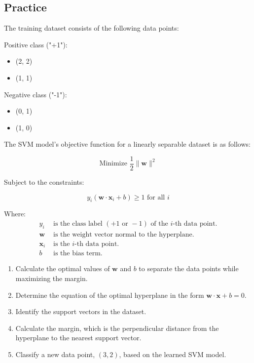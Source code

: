 \documentclass[]{article}
\begin{document}
	
	
	
	\subsection{Practice}
	The training dataset consists of the following data points:
	
	Positive class ("+1"):
	\begin{itemize}
		\item (2, 2)
		\item (1, 1)
	\end{itemize}
	
	Negative class ("-1"):
	\begin{itemize}
		\item (0, 1)
		\item (1, 0)
	\end{itemize}
	
	The SVM model's objective function for a linearly separable dataset is as follows:
	
	\[
	\text{Minimize } \frac{1}{2}\|\mathbf{w}\|^2
	\]
	
	Subject to the constraints:
	
	\[
	y_i(\mathbf{w}\cdot\mathbf{x}_i + b) \geq 1 \text{ for all } i
	\]
	
	Where:
	\begin{align*}
		y_i & \text{ is the class label } (+1 \text{ or } -1) \text{ of the } i\text{-th data point.} \\
		\mathbf{w} & \text{ is the weight vector normal to the hyperplane.} \\
		\mathbf{x}_i & \text{ is the } i\text{-th data point.} \\
		b & \text{ is the bias term.}
	\end{align*}
	
	\begin{enumerate}
		\item Calculate the optimal values of \(\mathbf{w}\) and \(b\) to separate the data points while maximizing the margin.
		\item Determine the equation of the optimal hyperplane in the form \(\mathbf{w}\cdot\mathbf{x} + b = 0\).
		\item Identify the support vectors in the dataset.
		\item Calculate the margin, which is the perpendicular distance from the hyperplane to the nearest support vector.
		\item Classify a new data point, \((3, 2)\), based on the learned SVM model.
	\end{enumerate}
	
\end{document}
